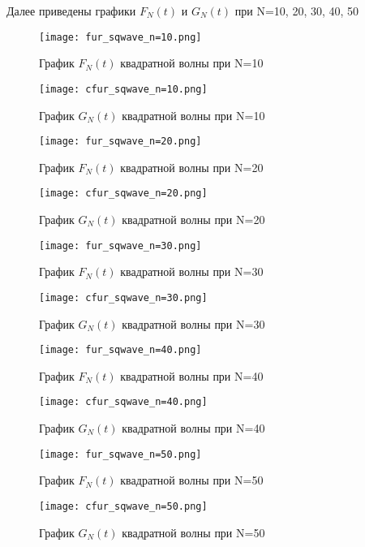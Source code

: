 \documentclass[a4paper, 16pt]{article}
\begin{document}
\noindent Далее приведены графики $F_N(t)$ и $G_N(t)$ при N=10, 20, 30, 40, 50


\newpage
\vspace*{10mm}
\begin{figure}[!htb]
    \centering
    \texttt{[image: fur\_sqwave\_n=10.png]}
    \captionsetup{skip=0pt}
    \caption{График $F_N(t)$ квадратной волны при N=10}
    \label{Рис:2}
\end{figure}
\begin{figure}[!htb]
    \centering
    \texttt{[image: cfur\_sqwave\_n=10.png]}
    \captionsetup{skip=0pt}
    \caption{График $G_N(t)$ квадратной волны при N=10}
    \label{Рис:3}
\end{figure}
\newpage
\vspace*{10mm}
\begin{figure}[!htb]
    \centering
    \texttt{[image: fur\_sqwave\_n=20.png]}
    \captionsetup{skip=0pt}
    \caption{График $F_N(t)$ квадратной волны при N=20}
    \label{Рис:4}
\end{figure}
\begin{figure}[!htb]
    \centering
    \texttt{[image: cfur\_sqwave\_n=20.png]}
    \captionsetup{skip=0pt}
    \caption{График $G_N(t)$ квадратной волны при N=20}
    \label{Рис:5}
\end{figure}
\newpage
\vspace*{10mm}
\begin{figure}[!htb]
    \centering
    \texttt{[image: fur\_sqwave\_n=30.png]}
    \captionsetup{skip=0pt}
    \caption{График $F_N(t)$ квадратной волны при N=30}
    \label{Рис:6}
\end{figure}
\begin{figure}[!htb]
    \centering
    \texttt{[image: cfur\_sqwave\_n=30.png]}
    \captionsetup{skip=0pt}
    \caption{График $G_N(t)$ квадратной волны при N=30}
    \label{Рис:7}
\end{figure}
\newpage
\vspace*{10mm}
\begin{figure}[!htb]
    \centering
    \texttt{[image: fur\_sqwave\_n=40.png]}
    \captionsetup{skip=0pt}
    \caption{График $F_N(t)$ квадратной волны при N=40}
    \label{Рис:8}
\end{figure}
\begin{figure}[!htb]
    \centering
    \texttt{[image: cfur\_sqwave\_n=40.png]}
    \captionsetup{skip=0pt}
    \caption{График $G_N(t)$ квадратной волны при N=40}
    \label{Рис:9}
\end{figure}
\newpage
\begin{figure}[!htb]
    \centering
    \texttt{[image: fur\_sqwave\_n=50.png]}
    \captionsetup{skip=0pt}
    \caption{График $F_N(t)$ квадратной волны при N=50}
    \label{Рис:10}
\end{figure}
\begin{figure}[!htb]
    \centering
    \texttt{[image: cfur\_sqwave\_n=50.png]}
    \captionsetup{skip=0pt}
    \caption{График $G_N(t)$ квадратной волны при N=50}
    \label{Рис:11}
\end{figure}
\end{document}
